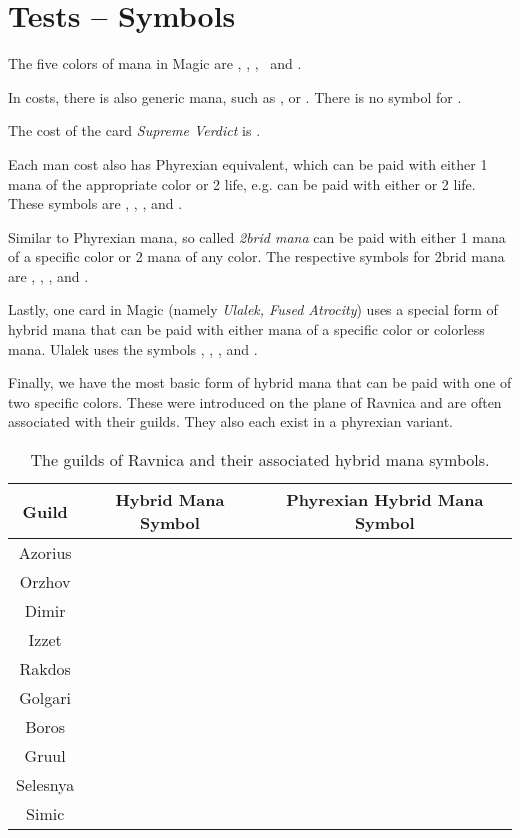 \documentclass[a4paper]{scrartcl}
\begin{document}
	\section*{Tests -- Symbols}
	The five colors of mana in Magic are \mtgwhite, \mtgblue, \mtgblack, \mtgred\ and \mtggreen .

	In costs, there is also generic mana, such as ,  or .
	There is no symbol for .

	The cost of the card \emph{Supreme Verdict} is \mtgwhite\mtgblue .

	Each man cost also has Phyrexian equivalent, which can be paid with either 1 mana of the appropriate color or 2 life, e.g. \mtgUP{} can be paid with either \mtgU{} or 2 life.
	These symbols are \mtgWP, \mtgUP, \mtgBP, \mtgRP{} and \mtgGP.

	Similar to Phyrexian mana, so called \emph{2brid mana} can be paid with either 1 mana of a specific color or 2 mana of any color.
	The respective symbols for 2brid mana are \mtgTwoW, \mtgTwoU, \mtgTwoB, \mtgTwoR{} and \mtgTwoG.

	Lastly, one card in Magic (namely \emph{Ulalek, Fused Atrocity}) uses a special form of hybrid mana that can be paid with either mana of a specific color or colorless mana.
	Ulalek uses the symbols \mtgCW, \mtgCU, \mtgCB, \mtgCR{} and \mtgCG.

	Finally, we have the most basic form of hybrid mana that can be paid with one of two specific colors.
	These were introduced on the plane of Ravnica and are often associated with their guilds.
	They also each exist in a phyrexian variant.
	\begin{table}[h]
		\begin{tabular}{c c c}
			\textbf{Guild} & \textbf{Hybrid Mana Symbol} & \textbf{Phyrexian Hybrid Mana Symbol}\\\hline
			Azorius  & \mtgWU & \mtgWUP \\
			Orzhov   & \mtgWB & \mtgWBP \\
			Dimir    & \mtgUB & \mtgUBP \\
			Izzet    & \mtgUR & \mtgURP \\
			Rakdos   & \mtgBR & \mtgBRP \\
			Golgari  & \mtgBG & \mtgBGP \\
			Boros    & \mtgRW & \mtgRWP \\
			Gruul    & \mtgRG & \mtgRGP \\
			Selesnya & \mtgGW & \mtgGWP \\
			Simic    & \mtgGU & \mtgGUP 
		\end{tabular}
		\caption{The guilds of Ravnica and their associated hybrid mana symbols.}
	\end{table}
\end{document}
